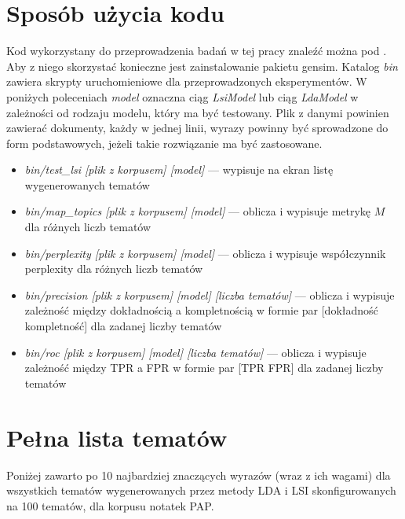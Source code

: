 \documentclass[11pt,a4paper]{article}
\begin{document}
\pagebreak

\section{Sposób użycia kodu}
\label{sec:code}

Kod wykorzystany do przeprowadzenia badań w tej pracy znaleźć można pod
\cite{code}. Aby z niego skorzystać konieczne jest zainstalowanie pakietu
gensim. Katalog \emph{bin} zawiera skrypty uruchomieniowe dla przeprowadzonych
eksperymentów. W poniżych poleceniach \emph{model} oznaczna ciąg
\emph{LsiModel} lub ciąg \emph{LdaModel} w zależności od rodzaju modelu, który
ma być testowany. Plik z danymi powinien zawierać dokumenty, każdy w jednej
linii, wyrazy powinny być sprowadzone do form podstawowych, jeżeli takie
rozwiązanie ma być zastosowane.

\begin{itemize}
\item \emph{bin/test\_lsi [plik z korpusem] [model]} --- wypisuje na ekran
listę wygenerowanych tematów
\item \emph{bin/map\_topics [plik z korpusem] [model]} --- oblicza i wypisuje
metrykę $M$ dla różnych liczb tematów
\item \emph{bin/perplexity [plik z korpusem] [model]} --- oblicza i wypisuje
współczynnik perplexity dla różnych liczb tematów
\item \emph{bin/precision [plik z korpusem] [model] [liczba tematów]} ---
oblicza i wypisuje zależność między dokładnością a kompletnością w formie
par [dokładność kompletność] dla zadanej liczby tematów
\item \emph{bin/roc [plik z korpusem] [model] [liczba tematów]} ---
oblicza i wypisuje zależność między TPR a FPR w formie
par [TPR FPR] dla zadanej liczby tematów
\end{itemize}

\pagebreak

\section{Pełna lista tematów}
\label{sec:full-results}

Poniżej zawarto po 10 najbardziej znaczących wyrazów (wraz z ich wagami) dla
wszystkich tematów wygenerowanych przez metody LDA i LSI skonfigurowanych na
100 tematów, dla korpusu notatek PAP.
\end{document}
